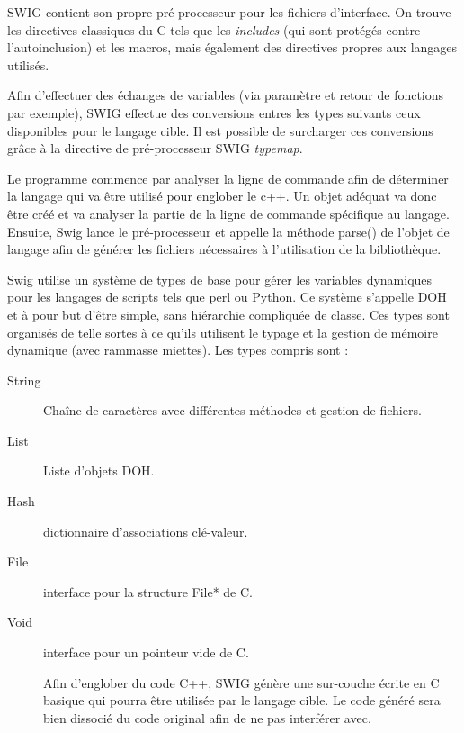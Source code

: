 \documentclass[11pt, french, screen]{report-rd-info}
\begin{document}
SWIG contient son propre pré-processeur pour les fichiers d'interface. On trouve les directives classiques du C tels que les \emph{includes} (qui sont protégés contre l'autoinclusion) et les macros, mais également des directives propres aux langages utilisés.

Afin d'effectuer des échanges de variables (via paramètre et retour de fonctions par exemple), SWIG effectue des conversions entres les types suivants ceux disponibles pour le langage cible. Il est possible de surcharger ces conversions grâce à la directive de pré-processeur SWIG \emph{typemap}.

Le programme commence par analyser la ligne de commande afin de déterminer la langage qui va être utilisé pour englober le c++. Un objet adéquat va donc être créé et va analyser la partie de la ligne de commande spécifique au langage. Ensuite, Swig lance le pré-processeur et appelle la méthode parse() de l'objet de langage afin de générer les fichiers nécessaires à l'utilisation de la bibliothèque.

Swig utilise un système de types de base pour gérer les variables dynamiques pour les langages de scripts tels que perl ou Python. Ce système s'appelle DOH et à pour but d'être simple, sans hiérarchie compliquée de classe. Ces types sont organisés de telle sortes à ce qu'ils utilisent le typage et la gestion de mémoire dynamique (avec rammasse miettes). Les types compris sont :
\begin{description}
\item[String] Chaîne de caractères avec différentes méthodes et gestion de fichiers.

\item[List] Liste d'objets DOH.

\item[Hash] dictionnaire d'associations clé-valeur.

\item[File] interface pour la structure File* de C.

\item[Void] interface pour un pointeur vide de C.

Afin d'englober du code C++, SWIG génère une sur-couche écrite en C basique qui pourra être utilisée par le langage cible. Le code généré sera bien dissocié du code original afin de ne pas interférer avec.

\end{description}
\end{document}
